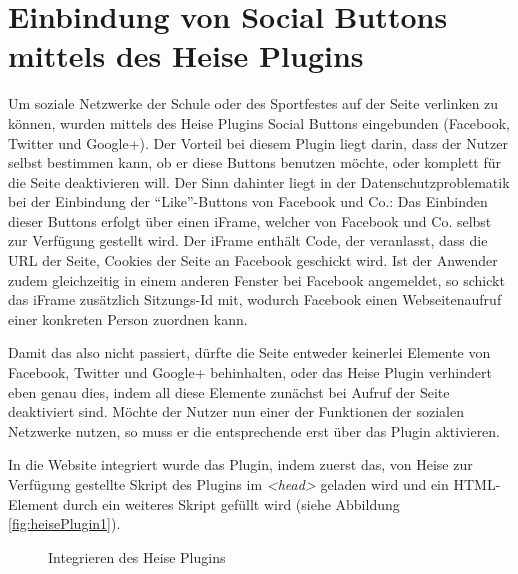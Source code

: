 \section{Einbindung von Social Buttons mittels des Heise Plugins}
\label{Einbindung von Social Buttons mittels des Heise Plugins}
Um soziale Netzwerke der Schule oder des Sportfestes auf der Seite verlinken zu können, wurden mittels des Heise Plugins Social Buttons eingebunden (Facebook, Twitter und Google+). Der Vorteil bei diesem Plugin liegt darin, dass der Nutzer selbst bestimmen kann, ob er diese Buttons benutzen möchte, oder komplett für die Seite deaktivieren will. Der Sinn dahinter liegt in der Datenschutzproblematik bei der Einbindung der "`Like"'-Buttons von Facebook und Co.: Das Einbinden dieser Buttons erfolgt über einen iFrame, welcher von Facebook und Co. selbst zur Verfügung gestellt wird. Der iFrame enthält Code, der veranlasst, dass die URL der Seite, Cookies der Seite an Facebook geschickt wird. Ist der Anwender zudem gleichzeitig in einem anderen Fenster bei Facebook angemeldet, so schickt das iFrame zusätzlich Sitzungs-Id mit, wodurch Facebook einen Webseitenaufruf einer konkreten Person zuordnen kann.
\par
Damit das also nicht passiert, dürfte die Seite entweder keinerlei Elemente von Facebook, Twitter und Google+ behinhalten, oder das Heise Plugin verhindert eben genau dies, indem all diese Elemente zunächst bei Aufruf der Seite deaktiviert sind. Möchte der Nutzer nun einer der Funktionen der sozialen Netzwerke nutzen, so muss er die entsprechende erst über das Plugin aktivieren.
\par
In die Website integriert wurde das Plugin, indem zuerst das, von Heise zur Verfügung gestellte Skript des Plugins im \textit{<head>} geladen wird und ein HTML-Element durch ein weiteres Skript gefüllt wird (siehe Abbildung \vref{fig:heisePlugin1}).

\begin{figure}[!h]
	\caption{Integrieren des Heise Plugins}
	\label{fig:heisePlugin1}
\end{figure}

